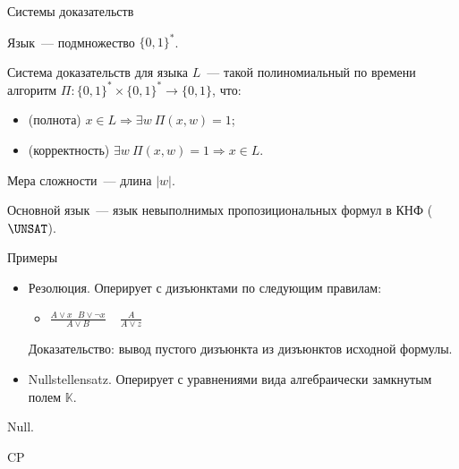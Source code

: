 \begin{frame}{Системы доказательств}

	Язык~--- подмножество $\{0, 1\}^*$.

    \begin{definition}
        Система доказательств для языка $L$~--- такой полиномиальный по времени алгоритм $\Pi: \{0,
        1\}^* \times \{0, 1\}^* \rightarrow \{0, 1\}$, что:
        \begin{itemize}
            \item (полнота) $x \in L \Rightarrow \exists w ~ \Pi(x, w) = 1$;
            \item (корректность) $\exists w ~ \Pi(x, w) = 1 \Rightarrow x \in L$.
        \end{itemize}
    \end{definition}

    \pause

    Мера сложности~--- длина $|w|$.

    \pause

    Основной язык~--- язык невыполнимых пропозициональных формул в КНФ ($\UNSAT$).

\end{frame}


\begin{frame}{Примеры}

    \begin{itemize}
        \item Резолюция.
            \pause
            Оперирует с дизъюнктами по следующим правилам:
            \begin{itemize}
                \item $\frac{A \lor x ~~~ B \lor \neg x}{A \lor B} ~~~~~ \frac{A}{A \lor z}$
            \end{itemize}
            Доказательство: вывод пустого дизъюнкта из дизъюнктов исходной формулы.
        \pause
        \item Nullstellensatz.
            \pause
            Оперирует с уравнениями вида  алгебраически замкнутым полем $\mathbb{K}$.
    \end{itemize}

    Null.

    CP
\end{frame}


